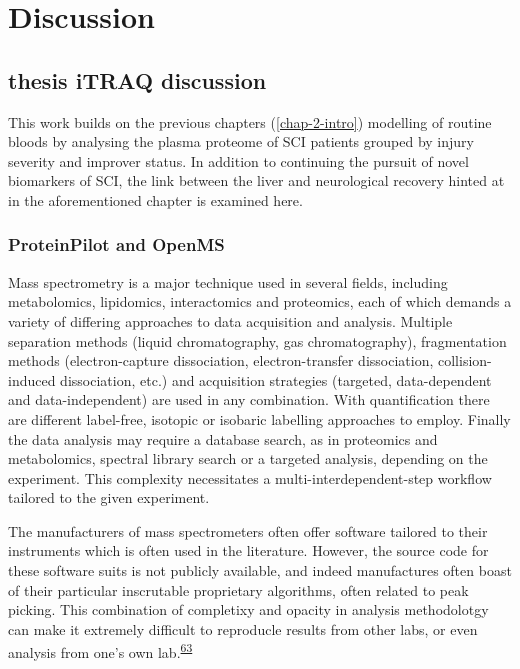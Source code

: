 \documentclass[
]{article}
\begin{document}
\hypertarget{discussion}{%
\section{Discussion}\label{discussion}}

\hypertarget{thesis-itraq-discussion}{%
\subsection{thesis iTRAQ discussion}\label{thesis-itraq-discussion}}

This work builds on the previous chapters (\ref{chap-2-intro}) modelling of routine bloods by analysing the plasma proteome of SCI patients grouped by injury severity and improver status.
In addition to continuing the pursuit of novel biomarkers of SCI, the link between the liver and neurological recovery hinted at in the aforementioned chapter is examined here.

\hypertarget{proteinpilot-and-openms}{%
\subsubsection{ProteinPilot and OpenMS}\label{proteinpilot-and-openms}}

Mass spectrometry is a major technique used in several fields, including metabolomics, lipidomics, interactomics and proteomics, each of which demands a variety of differing approaches to data acquisition and analysis.
Multiple separation methods (liquid chromatography, gas chromatography), fragmentation methods (electron-capture dissociation, electron-transfer dissociation, collision-induced dissociation, etc.) and acquisition strategies (targeted, data-dependent and data-independent) are used in any combination.
With quantification there are different label-free, isotopic or isobaric labelling approaches to employ.
Finally the data analysis may require a database search, as in proteomics and metabolomics, spectral library search or a targeted analysis, depending on the experiment.
This complexity necessitates a multi-interdependent-step workflow tailored to the given experiment.

The manufacturers of mass spectrometers often offer software tailored to their instruments which is often used in the literature.
However, the source code for these software suits is not publicly available, and indeed manufactures often boast of their particular inscrutable proprietary algorithms, often related to peak picking.
This combination of completixy and opacity in analysis methodolotgy can make it extremely difficult to reproducle results from other labs, or even analysis from one's own lab.\textsuperscript{\protect\hyperlink{ref-noauthor_devil_2011}{63}}
\end{document}
